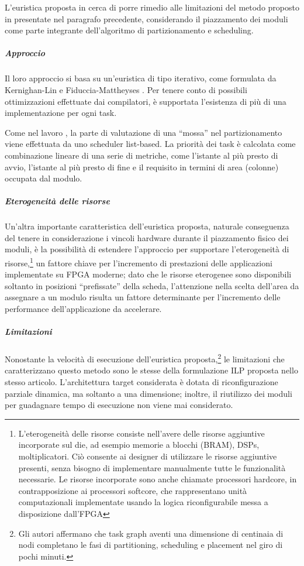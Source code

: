 L'euristica proposta in \cite{BanerjeePhysicalConstraints} cerca di porre 
rimedio alle limitazioni del metodo proposto in \cite{JeongHWSWCosynthesis} 
presentate nel paragrafo precedente, considerando il piazzamento dei moduli 
come parte integrante dell'algoritmo di partizionamento e scheduling.


\subparagraph{Approccio}
Il loro approccio si basa su un'euristica di tipo iterativo, come formulata da 
Kernighan-Lin \cite{KernighanLin} e Fiduccia-Mattheyses 
\cite{FiducciaMattheyses}. Per tenere conto di possibili ottimizzazioni 
effettuate dai compilatori, è supportata l'esistenza di più di una 
implementazione per ogni task.

Come nel lavoro \cite{JeongHWSWCosynthesis}, la parte di valutazione di una 
``mossa'' nel partizionamento viene effettuata da uno scheduler list-based. La 
priorità dei task è calcolata come combinazione lineare di una serie di 
metriche, come l'istante al più presto di avvio, l'istante al più presto di 
fine e il requisito in termini di area (colonne) occupata dal modulo.


\subparagraph{Eterogeneità delle risorse}
Un'altra importante caratteristica dell'euristica proposta, naturale 
conseguenza del tenere in considerazione i vincoli hardware durante il 
piazzamento fisico dei moduli, è la possibilità di estendere l'approccio per 
supportare l'eterogeneità di risorse,\footnote{L'eterogeneità delle risorse 
consiste nell'avere delle risorse aggiuntive incorporate sul die, ad esempio 
memorie a blocchi (\acs{BRAM}), \acp{DSP}, moltiplicatori. Ciò consente ai 
designer di utilizzare le risorse aggiuntive presenti, senza bisogno di 
implementare manualmente tutte le funzionalità necessarie. Le risorse 
incorporate sono anche chiamate processori hardcore, in contrapposizione ai 
processori softcore, che rappresentano unità computazionali implementate usando 
la logica riconfigurabile messa a disposizione dall'\ac{FPGA}} un fattore 
chiave per l'incremento di prestazioni delle applicazioni implementate su 
\ac{FPGA} moderne; dato che le risorse eterogenee sono disponibili soltanto in 
posizioni ``prefissate'' della scheda, l'attenzione nella scelta dell'area da 
assegnare a un modulo risulta un fattore determinante per l'incremento delle 
performance dell'applicazione da accelerare.

\subparagraph{Limitazioni}
Nonostante la velocità di esecuzione dell'euristica proposta,\footnote{Gli 
autori affermano che task graph aventi una dimensione di centinaia di nodi 
completano le fasi di partitioning, scheduling e placement nel giro di pochi 
minuti.} le limitazioni che caratterizzano questo metodo sono le stesse della 
formulazione \ac{ILP} proposta nello stesso articolo. L'architettura target
considerata è dotata di riconfigurazione parziale dinamica, ma soltanto a una 
dimensione; inoltre, il riutilizzo dei moduli per guadagnare tempo di esecuzione 
non viene mai considerato.

